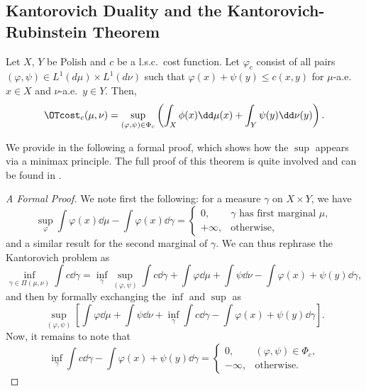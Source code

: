 \documentclass[oneside,reqno,letterpaper]{amsart}
\begin{document}
\subsection{Kantorovich Duality and the Kantorovich-Rubinstein Theorem}
\begin{theorem}
  Let \(X\), \(Y\) be Polish and \(c\) be a l.s.c.\ cost function.
  Let \(\varphi_c\) consist of all pairs \((\varphi, \psi) \in L^1(d\mu) \times L^1(d\nu)\) such that \(\varphi(x) + \psi(y) \leq c(x, y)\) for \(\mu\)-a.e.\ \(x \in X\) and \(\nu\)-a.e.\ \(y \in Y\).
  Then,
  \[
    \OTcost_c(\mu, \nu)
    = \sup_{(\varphi, \psi) \in \Phi_c} \left( \int_X \phi(x) \dd \mu(x) + \int_Y \psi(y) \dd \nu(y) \right).
  \]
\end{theorem}
We provide in the following a formal proof, which shows how the \(\sup\) appears via a minimax principle.
The full proof of this theorem is quite involved and can be found in \cite[pp.\ 26--33]{Villani2003}.
\begin{proof}[A Formal Proof]
  We note first the following:
  for a measure \(\gamma\) on \(X \times Y\), we have
  \[
    \sup_{\varphi} \int \varphi(x) \dd \mu - \int \varphi(x) \dd \gamma
    = \begin{cases}
      0, & \gamma \text{ has first marginal } \mu, \\
      + \infty, & \text{otherwise},
    \end{cases}
  \]
  and a similar result for the second marginal of \(\gamma\).
  We can thus rephrase the Kantorovich problem as
  \[
    \inf_{\gamma \in \Pi(\mu, \nu)} \int c \dd \gamma
    = \inf_{\gamma} \sup_{(\varphi, \psi)} \int c \dd \gamma + \int \varphi \dd \mu + \int \psi \dd \nu - \int \varphi(x) + \psi(y) \dd \gamma,
  \]
  and then by formally exchanging the \(\inf\) and \(\sup\) as
  \[
    \sup_{(\varphi, \psi)} \left[ \int \varphi \dd \mu + \int \psi \dd \nu 
      + \inf_{\gamma} \int c \dd \gamma - \int \varphi(x) + \psi(y) \dd \gamma \right].
  \]
  Now, it remains to note that
  \[
    \inf_{\gamma} \int c \dd \gamma - \int \varphi(x) + \psi(y) \dd \gamma
    = \begin{cases}
      0, & (\varphi, \psi) \in \Phi_c, \\
      -\infty, & \text{otherwise}.
    \end{cases}
  \]
\end{proof}
\end{document}
